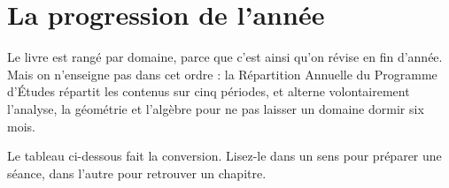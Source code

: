 \chapter*{La progression de l'année}

Le livre est rangé par domaine, parce que c'est ainsi qu'on révise en fin
d'année. Mais on n'enseigne pas dans cet ordre : la Répartition Annuelle du
Programme d'Études répartit les contenus sur cinq périodes, et alterne
volontairement l'analyse, la géométrie et l'algèbre pour ne pas laisser un
domaine dormir six mois.

Le tableau ci-dessous fait la conversion. Lisez-le dans un sens pour préparer
une séance, dans l'autre pour retrouver un chapitre.

\vspace{1em}

\newcommand{\pastille}[2]{\tikz[baseline=-0.2em]{\fill[#1] (0,0) circle (0.24em);}~\small #2}

